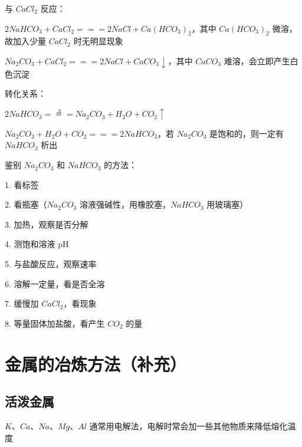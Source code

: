 \documentclass[UTF8,zihao=-4,openany]{ctexbook}
\begin{document}
与 $CaCl_2$ 反应：\par

$2NaHCO_3+CaCl_2=\!=\!=2NaCl+Ca(HCO_3)_2$，其中 $Ca(HCO_3)_2$ 微溶，故加入少量 $CaCl_2$ 时无明显现象\par

$Na_2CO_3+CaCl_2=\!=\!=2NaCl+CaCO_3\downarrow$，其中 $CaCO_3$ 难溶，会立即产生白色沉淀\par

转化关系：\par

$2NaHCO_3\stackrel{\Delta}{=\!=\!=}Na_2CO_3+H_2O+CO_2\uparrow$\par

$Na_2CO_3+H_2O+CO_2=\!=\!=2NaHCO_3$，若 $Na_2CO_3$ 是饱和的，则一定有 $NaHCO_3$ 析出\par

鉴别 $Na_2CO_3$ 和 $NaHCO_3$ 的方法：\par

1. 看标签\par

2. 看瓶塞（$Na_2CO_3$ 溶液强碱性，用橡胶塞，$NaHCO_3$ 用玻璃塞）\par

3. 加热，观察是否分解\par

4. 测饱和溶液 pH\par

5. 与盐酸反应，观察速率\par

6. 溶解一定量，看是否全溶\par

7. 缓慢加 $CaCl_2$，看现象\par

8. 等量固体加盐酸，看产生 $CO_2$ 的量\par

\section{金属的冶炼方法（补充）}
\subsection{活泼金属}
$K$、$Ca$、$Na$、$Mg$、$Al$ 通常用电解法，电解时常会加一些其他物质来降低熔化温度\par

\begin{table}[H]
\centering
\scriptsize
\renewcommand{\arraystretch}{1.14}
\end{table}
\end{document}
